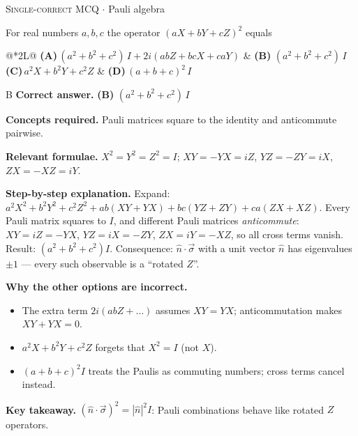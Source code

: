 \documentclass[11pt,a4paper]{article}
\newcommand{\optlabel}[1]{\textbf{(#1)}}
\newcommand{\correctlabel}[1]{\textcolor{okgreen}{\textbf{(#1)}\,\ding{51}}}
\newenvironment{qitem}[1]{\begin{list}{}{\setlength{\leftmargin}{3.3em}\setlength{\labelwidth}{3.1em}%
  \setlength{\labelsep}{0.2em}\setlength{\topsep}{3pt}\setlength{\parsep}{3pt}}\item[\textbf{Q.#1}\hfill]}{\end{list}}
\newcommand{\qsep}{\par\vspace{2pt}{\color{black!15}\hrule}\vspace{4pt}}
\newcommand{\qmeta}[2]{{\footnotesize\color{black!60}\textsc{#1} \;$\cdot$\; #2}\par}
\begin{document}
\begin{qitem}{22}
\qmeta{Single-correct MCQ}{Pauli algebra}
For real numbers $a, b, c$ the operator $(aX + bY + cZ)^2$ equals
\par\smallskip\noindent\begin{tabularx}{\linewidth}{@{}*{2}{L}@{}}
\optlabel{A}\,$(a^2 + b^2 + c^2)\,I + 2i(abZ + bcX + caY)$ & \correctlabel{B}\,$(a^2 + b^2 + c^2)\,I$ \\[3pt]
\optlabel{C}\,$a^2X + b^2Y + c^2Z$ & \optlabel{D}\,$(a + b + c)^2\,I$
\end{tabularx}
\end{qitem}
\begin{solbox}{B}
\textbf{\color{brand}Correct answer.} \textcolor{okgreen}{\textbf{(B)}} $(a^2 + b^2 + c^2)\,I$

\textbf{\color{brand}Concepts required.} Pauli matrices square to the identity and anticommute pairwise.

\textbf{\color{brand}Relevant formulae.} $X^2 = Y^2 = Z^2 = I$; $XY = -YX = iZ$, $YZ = -ZY = iX$, $ZX = -XZ = iY$.

\textbf{\color{brand}Step-by-step explanation.} Expand: $a^2X^2 + b^2Y^2 + c^2Z^2 + ab(XY + YX) + bc(YZ + ZY) + ca(ZX + XZ)$.
Every Pauli matrix squares to $I$, and different Pauli matrices \emph{anticommute}: $XY = iZ = -YX$, $YZ = iX = -ZY$,
$ZX = iY = -XZ$, so all cross terms vanish. Result: $(a^2 + b^2 + c^2)I$. Consequence: $\hat n\cdot\vec\sigma$ with a unit vector
$\hat n$ has eigenvalues $\pm1$ --- every such observable is a ``rotated $Z$''.

\textbf{\color{brand}Why the other options are incorrect.}
\begin{itemize}[leftmargin=2.4em, itemsep=1pt, topsep=2pt]
\item[\textbf{(A)}] The extra term $2i(abZ + \dots)$ assumes $XY = YX$; anticommutation makes $XY + YX = 0$.
\item[\textbf{(C)}] $a^2X + b^2Y + c^2Z$ forgets that $X^2 = I$ (not $X$).
\item[\textbf{(D)}] $(a + b + c)^2I$ treats the Paulis as commuting numbers; cross terms cancel instead.
\end{itemize}
\textbf{\color{brand}Key takeaway.} $(\hat n\cdot\vec\sigma)^2 = |\hat n|^2I$: Pauli combinations behave like rotated $Z$ operators.
\end{solbox}
\qsep
\end{document}
